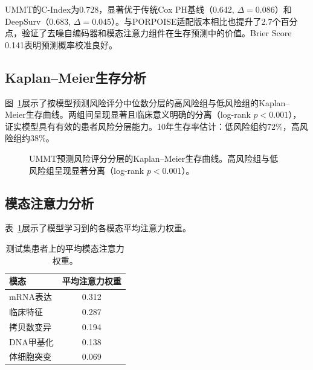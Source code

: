 \documentclass[conference]{IEEEtran}
\begin{document}
UMMT的C-Index为0.728，显著优于传统Cox PH基线（0.642, $\Delta=0.086$）和DeepSurv（0.683, $\Delta=0.045$）。与PORPOISE适配版本相比也提升了2.7个百分点，验证了去噪自编码器和模态注意力组件在生存预测中的价值。Brier Score 0.141表明预测概率校准良好。

\subsection{Kaplan--Meier生存分析}

图~\ref{fig:km}展示了按模型预测风险评分中位数分层的高风险组与低风险组的Kaplan--Meier生存曲线。两组间呈现显著且临床意义明确的分离（log-rank $p < 0.001$），证实模型具有有效的患者风险分层能力。10年生存率估计：低风险组约72\%，高风险组约38\%。

\begin{figure}[htbp]
\centering
{}
\caption{UMMT预测风险评分分层的Kaplan--Meier生存曲线。高风险组与低风险组呈现显著分离（log-rank $p < 0.001$）。}
\label{fig:km}
\end{figure}

\subsection{模态注意力分析}

表~\ref{tab:attention}展示了模型学习到的各模态平均注意力权重。

\begin{table}[htbp]
\centering
\caption{测试集患者上的平均模态注意力权重。}
\label{tab:attention}
\small
\begin{tabular}{@{}lc@{}}
\toprule
\textbf{模态} & \textbf{平均注意力权重} \\
\midrule
mRNA表达 & 0.312 \\
临床特征 & 0.287 \\
拷贝数变异 & 0.194 \\
DNA甲基化 & 0.138 \\
体细胞突变 & 0.069 \\
\bottomrule
\end{tabular}
\end{table}
\end{document}
